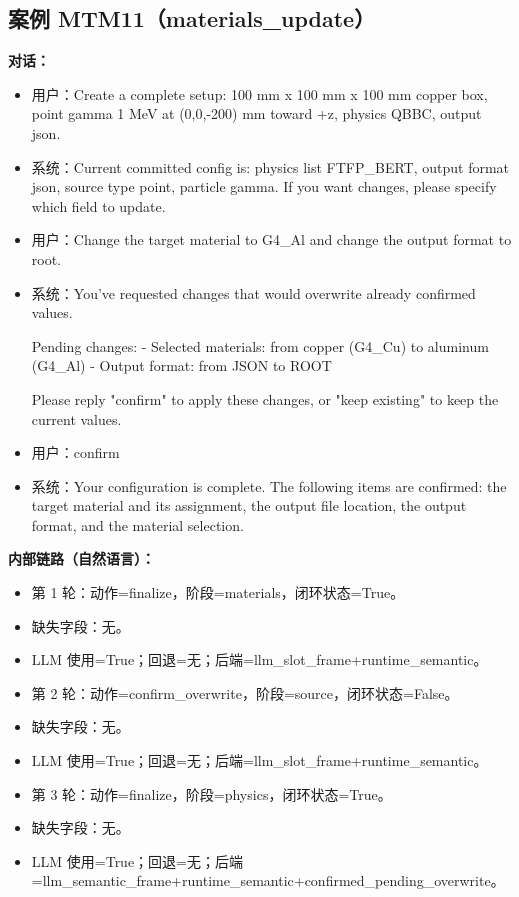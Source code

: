 \documentclass[11pt]{ctexart}
\begin{document}
\subsection{案例 MTM11（materials\_update）}
\textbf{对话：}
\begin{itemize}
\item 用户：Create a complete setup: 100 mm x 100 mm x 100 mm copper box, point gamma 1 MeV at (0,0,-200) mm toward +z, physics QBBC, output json.
\item 系统：Current committed config is: physics list FTFP\_BERT, output format json, source type point, particle gamma. If you want changes, please specify which field to update.
\item 用户：Change the target material to G4\_Al and change the output format to root.
\item 系统：You've requested changes that would overwrite already confirmed values.

Pending changes:
- Selected materials: from copper (G4\_Cu) to aluminum (G4\_Al)
- Output format: from JSON to ROOT

Please reply "confirm" to apply these changes, or "keep existing" to keep the current values.
\item 用户：confirm
\item 系统：Your configuration is complete. The following items are confirmed: the target material and its assignment, the output file location, the output format, and the material selection.
\end{itemize}
\textbf{内部链路（自然语言）：}
\begin{itemize}
\item 第 1 轮：动作=finalize，阶段=materials，闭环状态=True。
\item 缺失字段：无。
\item LLM 使用=True；回退=无；后端=llm\_slot\_frame+runtime\_semantic。
\item 第 2 轮：动作=confirm\_overwrite，阶段=source，闭环状态=False。
\item 缺失字段：无。
\item LLM 使用=True；回退=无；后端=llm\_slot\_frame+runtime\_semantic。
\item 第 3 轮：动作=finalize，阶段=physics，闭环状态=True。
\item 缺失字段：无。
\item LLM 使用=True；回退=无；后端=llm\_semantic\_frame+runtime\_semantic+confirmed\_pending\_overwrite。
\end{itemize}
\end{document}
